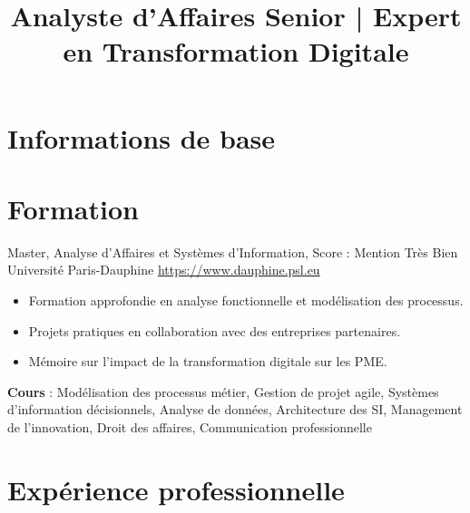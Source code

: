 \documentclass[a4paper, serif, 10pt]{moderncv}
\title{Analyste d'Affaires Senior | Expert en Transformation Digitale}
\begin{document}
\maketitle

\section{Informations de base}

\section{Formation}

        {Master, Analyse d'Affaires et Systèmes d'Information, Score : Mention Très Bien}
        {Université Paris-Dauphine}
        {\url{https://www.dauphine.psl.eu}}
        {}
        {\begin{itemize}
\item Formation approfondie en analyse fonctionnelle et modélisation des processus.
\item Projets pratiques en collaboration avec des entreprises partenaires.
\item Mémoire sur l'impact de la transformation digitale sur les PME.
\end{itemize}
\textbf{Cours} : Modélisation des processus métier, Gestion de projet agile, Systèmes d'information décisionnels, Analyse de données, Architecture des SI, Management de l'innovation, Droit des affaires, Communication professionnelle}
\section{Expérience professionnelle}
\end{document}
